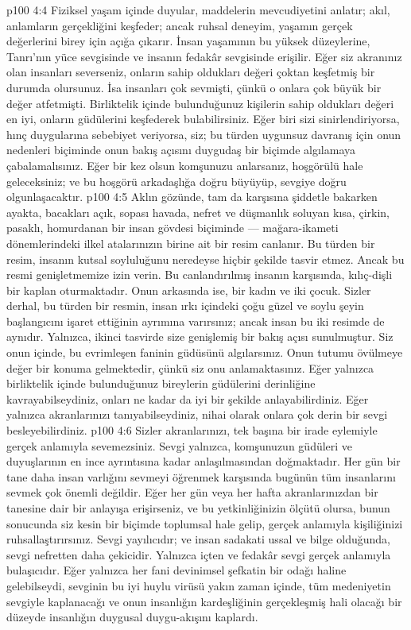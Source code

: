 \vs p100 4:4 Fiziksel yaşam içinde duyular, maddelerin mevcudiyetini anlatır; akıl, anlamların gerçekliğini keşfeder; ancak ruhsal deneyim, yaşamın gerçek değerlerini birey için açığa çıkarır. İnsan yaşamının bu yüksek düzeylerine, Tanrı’nın yüce sevgisinde ve insanın fedakâr sevgisinde erişilir. Eğer siz akranınız olan insanları severseniz, onların sahip oldukları değeri çoktan keşfetmiş bir durumda olursunuz. İsa insanları çok sevmişti, çünkü o onlara çok büyük bir değer atfetmişti. Birliktelik içinde bulunduğunuz kişilerin sahip oldukları değeri en iyi, onların güdülerini keşfederek bulabilirsiniz. Eğer biri sizi sinirlendiriyorsa, hınç duygularına sebebiyet veriyorsa, siz; bu türden uygunsuz davranış için onun nedenleri biçiminde onun bakış açısını duygudaş bir biçimde algılamaya çabalamalısınız. Eğer bir kez olsun komşunuzu anlarsanız, hoşgörülü hale geleceksiniz; ve bu hoşgörü arkadaşlığa doğru büyüyüp, sevgiye doğru olgunlaşacaktır.
\vs p100 4:5 Aklın gözünde, tam da karşısına şiddetle bakarken ayakta, bacakları açık, sopası havada, nefret ve düşmanlık soluyan kısa, çirkin, pasaklı, homurdanan bir insan gövdesi biçiminde --- mağara\hyp{}ikameti dönemlerindeki ilkel atalarınızın birine ait bir resim canlanır. Bu türden bir resim, insanın kutsal soyluluğunu neredeyse hiçbir şekilde tasvir etmez. Ancak bu resmi genişletmemize izin verin. Bu canlandırılmış insanın karşısında, kılıç\hyp{}dişli bir kaplan oturmaktadır. Onun arkasında ise, bir kadın ve iki çocuk. Sizler derhal, bu türden bir resmin, insan ırkı içindeki çoğu güzel ve soylu şeyin başlangıcını işaret ettiğinin ayrımına varırsınız; ancak insan bu iki resimde de aynıdır. Yalnızca, ikinci tasvirde size genişlemiş bir bakış açısı sunulmuştur. Siz onun içinde, bu evrimleşen faninin güdüsünü algılarsınız. Onun tutumu övülmeye değer bir konuma gelmektedir, çünkü siz onu anlamaktasınız. Eğer yalnızca birliktelik içinde bulunduğunuz bireylerin güdülerini derinliğine kavrayabilseydiniz, onları ne kadar da iyi bir şekilde anlayabilirdiniz. Eğer yalnızca akranlarınızı tanıyabilseydiniz, nihai olarak onlara çok derin bir sevgi besleyebilirdiniz.
\vs p100 4:6 Sizler akranlarınızı, tek başına bir irade eylemiyle gerçek anlamıyla sevemezsiniz. Sevgi yalnızca, komşunuzun güdüleri ve duyuşlarının en ince ayrıntısına kadar anlaşılmasından doğmaktadır. Her gün bir tane daha insan varlığını sevmeyi öğrenmek karşısında bugünün tüm insanlarını sevmek çok önemli değildir. Eğer her gün veya her hafta akranlarınızdan bir tanesine dair bir anlayışa erişirseniz, ve bu yetkinliğinizin ölçütü olursa, bunun sonucunda siz kesin bir biçimde toplumsal hale gelip, gerçek anlamıyla kişiliğinizi ruhsallaştırırsınız. Sevgi yayılıcıdır; ve insan sadakati ussal ve bilge olduğunda, sevgi nefretten daha çekicidir. Yalnızca içten ve fedakâr sevgi gerçek anlamıyla bulaşıcıdır. Eğer yalnızca her fani devinimsel şefkatin bir odağı haline gelebilseydi, sevginin bu iyi huylu virüsü yakın zaman içinde, tüm medeniyetin sevgiyle kaplanacağı ve onun insanlığın kardeşliğinin gerçekleşmiş hali olacağı bir düzeyde insanlığın duygusal duygu\hyp{}akışını kaplardı.
